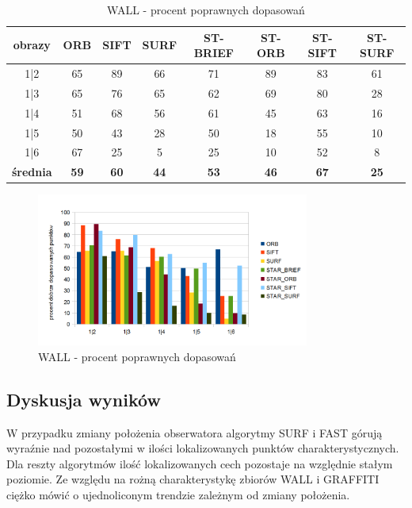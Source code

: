 \begin{table}[htbp]
  \centering
  \caption{WALL - procent poprawnych dopasowań}
    \begin{tabular}{|c|c|c|c|c|c|c|c|}\hline
    obrazy & \textbf{ORB} & \textbf{SIFT} & \textbf{SURF} & \textbf{ST-BRIEF} & \textbf{ST-ORB} & \textbf{ST-SIFT} & \textbf{ST-SURF} \\\hline
    1|2 & 65 & 89 & 66 & 71 & 89 & 83 & 61 \\
    1|3 & 65 & 76 & 65 & 62 & 69 & 80 & 28 \\
    1|4 & 51 & 68 & 56 & 61 & 45 & 63 & 16 \\
    1|5 & 50 & 43 & 28 & 50 & 18 & 55 & 10 \\
    1|6 & 67 & 25 & 5 & 25 & 10 & 52 & 8 \\\hline
    \textbf{średnia} & \textbf{59} & \textbf{60} & \textbf{44} & \textbf{53} & \textbf{46} & \textbf{67} & \textbf{25} \\\hline
    
    \end{tabular}%
  \label{tab:wall_m2}%
\end{table}%


\begin{figure}
\centering
\includegraphics[width=0.8\textwidth]{pict/mikolajczyk/wall/m2.png}
\caption{WALL - procent poprawnych dopasowań}
\label{fig:wall_m2}
\end{figure}
\FloatBarrier
\subsection{Dyskusja wyników}
W przypadku zmiany położenia obserwatora algorytmy SURF i FAST górują wyraźnie nad pozostałymi w ilości lokalizowanych punktów charakterystycznych. Dla reszty algorytmów ilość lokalizowanych cech pozostaje na względnie stałym poziomie. Ze względu na rożną charakterystykę zbiorów WALL i GRAFFITI ciężko mówić o ujednoliconym trendzie zależnym od zmiany położenia.

